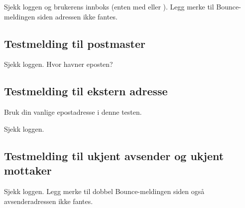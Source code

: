 
Sjekk loggen og brukerens innboks (enten med  eller ).
Legg merke til Bounce-meldingen siden adressen ikke fantes.

\subsection*{Testmelding til postmaster}


Sjekk loggen. Hvor havner eposten?

\subsection*{Testmelding til ekstern adresse}

Bruk din vanlige epostadresse i denne testen.


Sjekk loggen.

\subsection*{Testmelding til ukjent avsender og ukjent mottaker}


Sjekk loggen. Legg merke til dobbel Bounce-meldingen siden også avsenderadressen 
ikke fantes.
